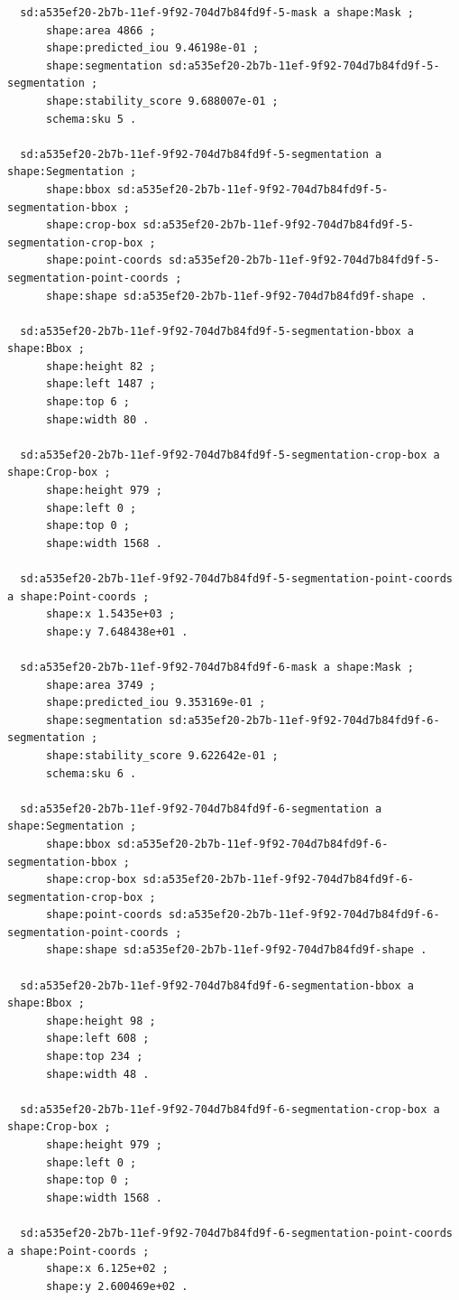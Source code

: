 \documentclass[732,fontsize=14pt,final]{studrep}
\begin{document}
\begin{verbatim}
  sd:a535ef20-2b7b-11ef-9f92-704d7b84fd9f-5-mask a shape:Mask ;
      shape:area 4866 ;
      shape:predicted_iou 9.46198e-01 ;
      shape:segmentation sd:a535ef20-2b7b-11ef-9f92-704d7b84fd9f-5-segmentation ;
      shape:stability_score 9.688007e-01 ;
      schema:sku 5 .
  
  sd:a535ef20-2b7b-11ef-9f92-704d7b84fd9f-5-segmentation a shape:Segmentation ;
      shape:bbox sd:a535ef20-2b7b-11ef-9f92-704d7b84fd9f-5-segmentation-bbox ;
      shape:crop-box sd:a535ef20-2b7b-11ef-9f92-704d7b84fd9f-5-segmentation-crop-box ;
      shape:point-coords sd:a535ef20-2b7b-11ef-9f92-704d7b84fd9f-5-segmentation-point-coords ;
      shape:shape sd:a535ef20-2b7b-11ef-9f92-704d7b84fd9f-shape .
  
  sd:a535ef20-2b7b-11ef-9f92-704d7b84fd9f-5-segmentation-bbox a shape:Bbox ;
      shape:height 82 ;
      shape:left 1487 ;
      shape:top 6 ;
      shape:width 80 .
  
  sd:a535ef20-2b7b-11ef-9f92-704d7b84fd9f-5-segmentation-crop-box a shape:Crop-box ;
      shape:height 979 ;
      shape:left 0 ;
      shape:top 0 ;
      shape:width 1568 .
  
  sd:a535ef20-2b7b-11ef-9f92-704d7b84fd9f-5-segmentation-point-coords a shape:Point-coords ;
      shape:x 1.5435e+03 ;
      shape:y 7.648438e+01 .
  
  sd:a535ef20-2b7b-11ef-9f92-704d7b84fd9f-6-mask a shape:Mask ;
      shape:area 3749 ;
      shape:predicted_iou 9.353169e-01 ;
      shape:segmentation sd:a535ef20-2b7b-11ef-9f92-704d7b84fd9f-6-segmentation ;
      shape:stability_score 9.622642e-01 ;
      schema:sku 6 .
  
  sd:a535ef20-2b7b-11ef-9f92-704d7b84fd9f-6-segmentation a shape:Segmentation ;
      shape:bbox sd:a535ef20-2b7b-11ef-9f92-704d7b84fd9f-6-segmentation-bbox ;
      shape:crop-box sd:a535ef20-2b7b-11ef-9f92-704d7b84fd9f-6-segmentation-crop-box ;
      shape:point-coords sd:a535ef20-2b7b-11ef-9f92-704d7b84fd9f-6-segmentation-point-coords ;
      shape:shape sd:a535ef20-2b7b-11ef-9f92-704d7b84fd9f-shape .
  
  sd:a535ef20-2b7b-11ef-9f92-704d7b84fd9f-6-segmentation-bbox a shape:Bbox ;
      shape:height 98 ;
      shape:left 608 ;
      shape:top 234 ;
      shape:width 48 .
  
  sd:a535ef20-2b7b-11ef-9f92-704d7b84fd9f-6-segmentation-crop-box a shape:Crop-box ;
      shape:height 979 ;
      shape:left 0 ;
      shape:top 0 ;
      shape:width 1568 .
  
  sd:a535ef20-2b7b-11ef-9f92-704d7b84fd9f-6-segmentation-point-coords a shape:Point-coords ;
      shape:x 6.125e+02 ;
      shape:y 2.600469e+02 .
  

\end{verbatim}
\end{document}
